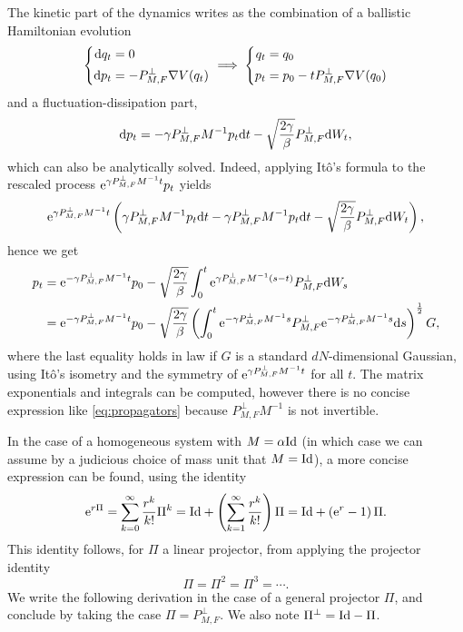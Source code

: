 The kinetic part of the dynamics writes as the combination of a ballistic Hamiltonian evolution
\begin{equation}
    \label{eq:elem_hamiltonian_equation}
    \left\{\begin{aligned}
        \mathrm{d} q_t&=0\\
        \mathrm{d} p_t&=-P_{M,F}^\perp\nabla V(q_t)
    \end{aligned}\right.\implies\left\{\begin{aligned}
        q_t&=q_0\\
        p_t&=p_0-tP_{M,F}^\perp\nabla V(q_0)
    \end{aligned}\right.
\end{equation}
and a fluctuation-dissipation part,
\begin{equation}
    \label{eq:projected_OU}
    \mathrm{d} p_t=-\gamma P_{M,F}^\perp M^{-1}p_t\mathrm{d} t-\sqrt{\frac{2\gamma}{\beta}}P_{M,F}^\perp\mathrm{d} W_t,
\end{equation}
which can also be analytically solved.
Indeed, applying Itô's formula to the rescaled process $\mathrm{e}^{\gamma P_{M,F}^\perp M^{-1}t}p_t$ yields
\[\mathrm{e}^{\gamma P_{M,F}^\perp M^{-1}t}\left(\gamma P_{M,F}^\perp M^{-1}p_t\mathrm{d} t - \gamma P_{M,F}^\perp M^{-1}p_t\mathrm{d} t-\sqrt{\frac{2\gamma}{\beta}} P_{M,F}^\perp\mathrm{d} W_t\right),\]
hence we get 
\begin{equation}
    \label{eq:projected_ou_analytical_form}
    \begin{aligned}
    p_t&=\mathrm{e}^{-\gamma P_{M,F}^\perp M^{-1}t}p_0-\sqrt{\frac{2\gamma}{\beta}}\int_0^t\mathrm{e}^{\gamma P_{M,F}^\perp M^{-1}(s-t)} P_{M,F}^\perp\mathrm{d} W_s\\
    &=\mathrm{e}^{-\gamma P_{M,F}^\perp M^{-1}t}p_0-\sqrt{\frac{2\gamma}{\beta}}\left(\int_0^t\mathrm{e}^{-\gamma P_{M,F}^\perp M^{-1}s}P_{M,F}^\perp\mathrm{e}^{-\gamma P_{M,F}^\perp M^{-1}s} \mathrm{d} s\right)^{\frac12}G,
    \end{aligned}
\end{equation}
where the last equality holds in law if $G$ is a standard $dN$-dimensional Gaussian, using Itô's isometry and the symmetry of $\mathrm{e}^{\gamma P_{M,F}^\perp M^{-1}t}$ for all $t$.
The matrix exponentials and integrals can be computed, however there is no concise expression like \eqref{eq:propagators} because $P_{M,F}^\perp M^{-1}$ is not invertible.

In the case of a homogeneous system with $M=\alpha\mathrm{Id}$ (in which case we can assume by a judicious choice of mass unit that $M=\mathrm{Id}$), a more concise expression can be found, using the identity
\[\mathrm{e}^{r\Pi}=\sum_{k=0}^\infty \frac{r^k}{k!}\Pi^k=\mathrm{Id}+\left(\sum_{k=1}^\infty\frac{r^k}{k!}\right)\Pi=\mathrm{Id}+\left(\mathrm{e}^r-1\right)\Pi.\]
This identity follows, for $\Pi$ a linear projector, from applying the projector identity \[\Pi=\Pi^2=\Pi^3=\dotsm.\]
We write the following derivation in the case of a general projector $\Pi$, and conclude by taking the case $\Pi=P_{M,F}^\perp$. We also note $\Pi^\perp=\mathrm{Id}-\Pi$.

